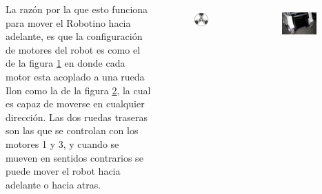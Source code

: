 \begin{frame}
	\begin{columns}
		La razón por la que esto funciona para mover el Robotino hacia adelante, es que la configuración de motores del robot es como el de la figura \ref{fig:robotino-omni} en donde cada motor esta acoplado a una rueda Ilon como la de la figura \ref{fig:ilon}, la cual es capaz de moverse en cualquier dirección. Las dos ruedas traseras son las que se controlan con los motores 1 y 3, y cuando se mueven en sentidos contrarios se puede mover el robot hacia adelante o hacia atras.

		\begin{figure}
			\begin{center}
				\includegraphics[width=0.8\textwidth]{images/robotino-omni.png}
				\label{fig:robotino-omni}
			\end{center}
		\end{figure}
		\begin{figure}
			\begin{center}
				\includegraphics[width=0.8\textwidth]{images/ilon.jpg}
				\label{fig:ilon}
			\end{center}
		\end{figure}
	\end{columns}
\end{frame}

